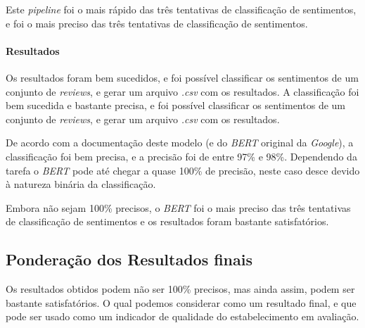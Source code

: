 Este \textit{pipeline} foi o mais rápido das três tentativas de classificação de sentimentos, e foi o mais preciso das três tentativas de classificação de sentimentos.

\paragraph{Resultados\\}

Os resultados foram bem sucedidos, e foi possível classificar os sentimentos de um conjunto de \textit{reviews}, e gerar um arquivo \textit{.csv} com os resultados. A classificação foi bem sucedida e bastante precisa, e foi possível classificar os sentimentos de um conjunto de \textit{reviews}, e gerar um arquivo \textit{.csv} com os resultados.

De acordo com a documentação deste modelo (e do \textit{BERT} original da \textit{Google}), a classificação foi bem precisa, e a precisão foi de entre 97\% e 98\%. Dependendo da tarefa o \textit{BERT} pode até chegar a quase 100\% de precisão, neste caso desce devido à natureza binária da classificação.

Embora não sejam 100\% precisos, o \textit{BERT} foi o mais preciso das três tentativas de classificação de sentimentos e os resultados foram bastante satisfatórios.

\subsection{Ponderação dos Resultados finais}

Os resultados obtidos podem não ser 100\% precisos, mas ainda assim, podem ser bastante satisfatórios. O qual podemos considerar como um resultado final, e que pode ser usado como um indicador de qualidade do estabelecimento em avaliação.